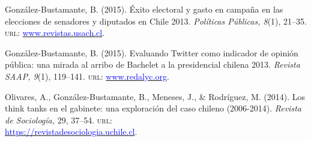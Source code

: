 \begin{publications}
\begin{benumerate}{14}
\item{González-Bustamante, B. (2015). Éxito electoral y gasto en campaña en las elecciones de senadores y diputados en Chile 2013. {\itshape Políticas Públicas, 8}(1), 21--35. {\scshape url:} \href{http://www.revistas.usach.cl/ojs/index.php/politicas/article/view/2182}{\textcolor{blue}{www.revistas.usach.cl}}.} \vspace{1mm}


\item{González-Bustamante, B. (2015). Evaluando Twitter como indicador de opinión pública: una mirada al arribo de Bachelet a la presidencial chilena 2013. {\itshape Revista SAAP, 9}(1), 119--141. {\scshape url:} \href{https://www.redalyc.org/articulo.oa?id=387142733006}{\textcolor{blue}{www.redalyc.org}}.} \vspace{1mm}


\item{Olivares, A., González-Bustamante, B., Meneses, J., \& Rodríguez, M. (2014). Los think tanks en el gabinete: una exploración del caso chileno (2006-2014). {\itshape Revista de Sociología,} 29, 37--54. {\scshape url:} \\ \href{https://revistadesociologia.uchile.cl/index.php/RDS/article/view/36177}{\textcolor{blue}{https://revistadesociologia.uchile.cl}}.} \vspace{1mm} %


\end{benumerate}
\end{publications}
